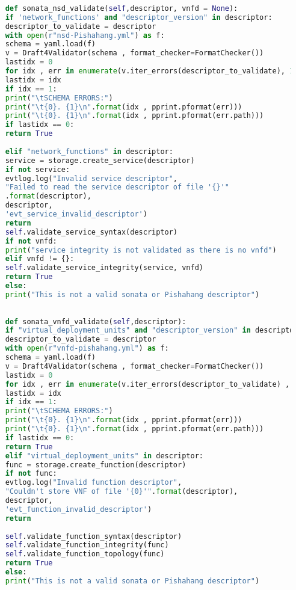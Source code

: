 \begin{lstlisting}[language=Python,caption=Validating Sonata or Pishahang and OSM descriptors (Both NSD and VNFD's), label=tvalidation]
	
	def sonata_nsd_validate(self,descriptor, vnfd = None):
	if 'network_functions' and "descriptor_version" in descriptor:
	descriptor_to_validate = descriptor
	with open(r"nsd-Pishahang.yml") as f:
	schema = yaml.load(f)
	v = Draft4Validator(schema , format_checker=FormatChecker())
	lastidx = 0
	for idx , err in enumerate(v.iter_errors(descriptor_to_validate), 1):
	lastidx = idx
	if idx == 1:
	print("\tSCHEMA ERRORS:")
	print("\t{0}. {1}\n".format(idx , pprint.pformat(err)))
	print("\t{0}. {1}\n".format(idx , pprint.pformat(err.path)))
	if lastidx == 0:
	return True
	
	elif "network_functions" in descriptor:
	service = storage.create_service(descriptor)
	if not service:
	evtlog.log("Invalid service descriptor",
	"Failed to read the service descriptor of file '{}'"
	.format(descriptor),
	descriptor,
	'evt_service_invalid_descriptor')
	return
	self.validate_service_syntax(descriptor)
	if not vnfd:
	print("service integrity is not validated as there is no vnfd")
	elif vnfd != {}:
	self.validate_service_integrity(service, vnfd)
	return True
	else:
	print("This is not a valid sonata or Pishahang descriptor")
	
	
	def sonata_vnfd_validate(self,descriptor):
	if "virtual_deployment_units" and "descriptor_version" in descriptor:
	descriptor_to_validate = descriptor
	with open(r"vnfd-pishahang.yml") as f:
	schema = yaml.load(f)
	v = Draft4Validator(schema , format_checker=FormatChecker())
	lastidx = 0
	for idx , err in enumerate(v.iter_errors(descriptor_to_validate) , 1):
	lastidx = idx
	if idx == 1:
	print("\tSCHEMA ERRORS:")
	print("\t{0}. {1}\n".format(idx , pprint.pformat(err)))
	print("\t{0}. {1}\n".format(idx , pprint.pformat(err.path)))
	if lastidx == 0:
	return True
	elif "virtual_deployment_units" in descriptor:
	func = storage.create_function(descriptor)
	if not func:
	evtlog.log("Invalid function descriptor",
	"Couldn't store VNF of file '{0}'".format(descriptor),
	descriptor,
	'evt_function_invalid_descriptor')
	return
	
	self.validate_function_syntax(descriptor)
	self.validate_function_integrity(func)
	self.validate_function_topology(func)
	return True
	else:
	print("This is not a valid sonata or Pishahang descriptor")
\end{lstlisting} 

